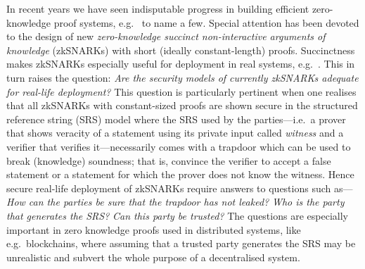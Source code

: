 \documentclass[runningheads,11pt]{llncs}
\theoremstyle{definition} \newtheorem{definition}[theorem]{Definition}
\begin{document}
In recent years we have seen indisputable progress in building efficient
zero-knowledge proof systems,
e.g.~\cite{AC:Groth10a,TCC:Lipmaa12,EC:GGPR13,SP:PHGR13,AC:Lipmaa13,AC:DFGK14,EC:Groth16,SP:BBBPWM18}
to name a few. Special attention has been devoted to the design of new
\emph{zero-knowledge succinct non-interactive arguments of knowledge} (zkSNARKs)
with short (ideally constant-length) proofs. Succinctness makes zkSNARKs
especially useful for deployment in real systems,
e.g.~\cite{REPO:Zcash20,ARXIV:RonZaj19,REPO:Zeth20,REPO:Celo20,REPO:Aztec20}.
This in turn raises the question: \emph{Are the security models of currently
  zkSNARKs adequate for real-life deployment?} This question is particularly
pertinent when one realises that all zkSNARKs with constant-sized proofs are
shown secure in the structured reference string (SRS) model where the SRS used
by the parties---i.e.~a prover that shows veracity of a statement using its
private input called \emph{witness} and a verifier that verifies
it---necessarily comes with a trapdoor which can be used to break (knowledge)
soundness; that is, convince the verifier to accept a false statement or a
statement for which the prover does not know the witness. Hence secure real-life
deployment of zkSNARKs require answers to questions such as---\emph{How can the
  parties be sure that the trapdoor has not leaked?}  \emph{Who is the party
  that generates the SRS?} \emph{Can this party be trusted?} The questions are
especially important in zero knowledge proofs used in distributed systems, like
e.g.~blockchains, where assuming that a trusted party generates the SRS may be
unrealistic and subvert the whole purpose of a decentralised system.
\end{document}
